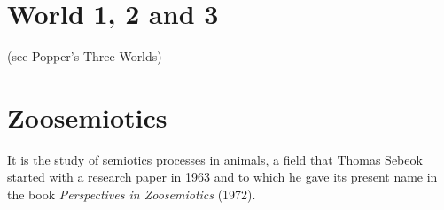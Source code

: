 \documentclass[12pt]{article}
\begin{document}
\section{World 1, 2 and 3} (see Popper's Three Worlds)


\section{Zoosemiotics}
It is the study of semiotics processes in animals, a field that Thomas Sebeok started with a research paper in 1963 and to which he gave its present name in the book \textit{Perspectives in Zoosemiotics} (1972). 
 




\end{document}
